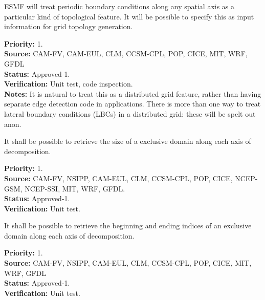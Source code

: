 
ESMF will treat periodic boundary conditions along any spatial axis as
a particular kind of topological feature. It will be possible to
specify this as input information for grid topology generation.

\begin{reqlist}
{\bf Priority:} 1. \\ 
{\bf Source:} CAM-FV, CAM-EUL, CLM, CCSM-CPL, POP, CICE, MIT, WRF, GFDL \\
{\bf Status:} Approved-1. \\
{\bf Verification:} Unit test, code inspection. \\
{\bf Notes:} It is natural to treat this as a distributed grid
  feature, rather than having separate edge detection code in
  applications. There is more than one way to treat lateral boundary
  conditions (LBCs) in a
  distributed grid: these will be spelt out anon.
\end{reqlist}




It shall be possible to retrieve the size of a exclusive domain
along each axis of decomposition.

\begin{reqlist}
{\bf Priority:} 1. \\ 
{\bf Source:} CAM-FV, NSIPP, CAM-EUL, CLM, CCSM-CPL, POP, CICE, NCEP-GSM, NCEP-SSI, MIT, WRF, GFDL. \\
{\bf Status:} Approved-1. \\
{\bf Verification:} Unit test.
\end{reqlist}


It shall be possible to retrieve the beginning and ending indices of 
an exclusive domain along each axis of decomposition.

\begin{reqlist}
{\bf Priority:} 1. \\ 
{\bf Source:} CAM-FV, NSIPP, CAM-EUL, CLM, CCSM-CPL, POP, CICE, MIT, WRF, GFDL \\
{\bf Status:} Approved-1. \\
{\bf Verification:} Unit test. 
\end{reqlist}


